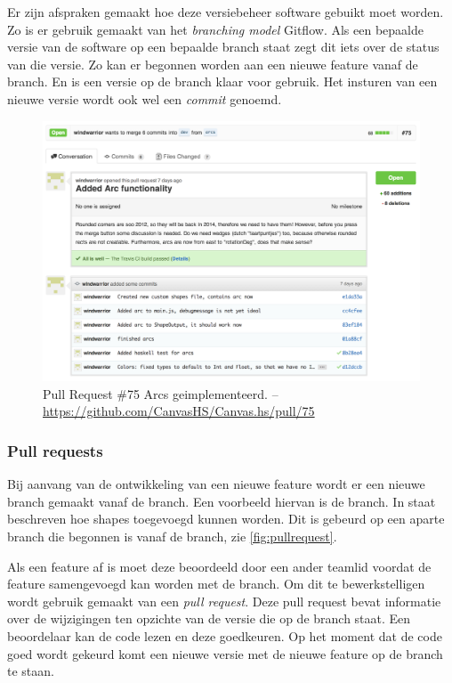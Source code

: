 Er zijn afspraken gemaakt hoe deze versiebeheer software gebuikt moet worden. Zo is er gebruik gemaakt van het \emph{branching model} Gitflow\cite{Gitflow2010}. Als een bepaalde versie van de software op een bepaalde branch staat zegt dit iets over de status van die versie. Zo kan er begonnen worden aan een nieuwe feature vanaf de  branch. En is een versie op de  branch klaar voor gebruik. Het insturen van een nieuwe versie wordt ook wel een \emph{commit} genoemd.

\begin{figure}[H]
\begin{center}
\includegraphics[keepaspectratio,width=\textwidth]{./images/pullrequest.png}
\caption{Pull Request \#75 Arcs geimplementeerd. – \url{https://github.com/CanvasHS/Canvas.hs/pull/75}}
\label{fig:pullrequest}
\end{center}
\end{figure}

\subsubsection{Pull requests}
Bij aanvang van de ontwikkeling van een nieuwe feature wordt er een nieuwe branch gemaakt vanaf de  branch. Een voorbeeld hiervan is de  branch. In  staat beschreven hoe  shapes toegevoegd kunnen worden. Dit is gebeurd op een aparte branch die begonnen is vanaf de  branch, zie \autoref{fig:pullrequest}.

Als een feature af is moet deze beoordeeld door een ander teamlid voordat de feature samengevoegd kan worden met de  branch. Om dit te bewerkstelligen wordt gebruik gemaakt van een \emph{pull request}. Deze pull request bevat informatie over de wijzigingen ten opzichte van de versie die op de  branch staat. Een beoordelaar kan de code lezen en deze goedkeuren. Op het moment dat de code goed wordt gekeurd komt een nieuwe versie met de nieuwe feature op de  branch te staan.

